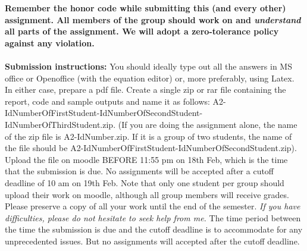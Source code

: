 \documentclass[11pt]{article}
\begin{document}
\maketitle

\textbf{Remember the honor code while submitting this (and every other) assignment. All members of the group should work on and \emph{understand} all parts of the assignment. We will adopt a \textbf{zero-tolerance policy} against any violation.}
\\
\\
\textbf{Submission instructions:} You should ideally type out all the answers in MS office or Openoffice (with the equation editor) or, more preferably, using Latex. In either case, prepare a pdf file. Create a single zip or rar file containing the report, code and sample outputs and name it as follows: A2-IdNumberOfFirstStudent-IdNumberOfSecondStudent-IdNumberOfThirdStudent.zip. (If you are doing the assignment alone, the name of the zip file is A2-IdNumber.zip. If it is a group of two students, the name of the file should be  A2-IdNumberOfFirstStudent-IdNumberOfSecondStudent.zip). Upload the file on moodle BEFORE 11:55 pm on 18th Feb, which is the time that the submission is due. No assignments will be accepted after a cutoff deadline of 10 am on 19th Feb. Note that only one student per group should upload their work on moodle, although all group members will receive grades. Please preserve a copy of all your work until the end of the semester. \emph{If you have difficulties, please do not hesitate to seek help from me.} The time period between the time the submission is due and the cutoff deadline is to accommodate for any unprecedented issues. But no assignments will accepted after the cutoff deadline. 
\end{document}
